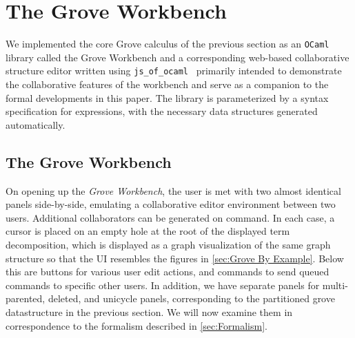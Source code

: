 
\section{The Grove Workbench}%
\label{sec:Implementation}

We implemented the core Grove calculus of the previous section as an \texttt{OCaml} library called the Grove Workbench and a corresponding web-based collaborative structure editor written using \texttt{js\_of\_ocaml}~\cite{DBLP:journals/spe/VouillonB14} primarily intended to demonstrate the collaborative features of the workbench and serve as a companion to the formal developments in this paper. The library is parameterized by a syntax specification for expressions, with the necessary data structures generated automatically.

\subsection{The Grove Workbench}
\label{sub:impl-grv}

On opening up the \emph{Grove Workbench}, the user is met with two almost identical panels side-by-side, emulating a collaborative editor environment between two users. Additional collaborators can be generated on command. In each case, a cursor is placed on an empty hole at the root of the displayed term decomposition, which is displayed as a graph visualization of the same graph structure so that the UI resembles the figures in \autoref{sec:Grove By Example}. Below this are buttons for various user edit actions, and commands to send queued commands to specific other users. In addition, we have separate panels for multi-parented, deleted, and unicycle panels, corresponding to the partitioned grove datastructure in the previous section. We will now examine them in correspondence to the formalism described in \autoref{sec:Formalism}. 



